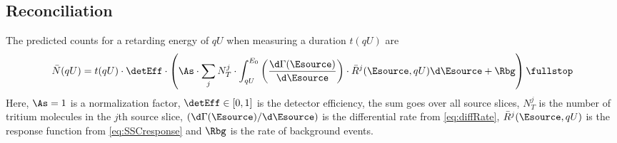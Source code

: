 \subsection{Reconciliation}
The predicted counts for a retarding energy of $qU$ when measuring a duration $t(qU)$ are
\begin{equation}
	\label{eq:countsSCCFinal}
	\bar{N}(qU) = t(qU) \cdot \detEff \cdot \left(
		\As \cdot
		 \sum_{j}
			N_T^j \cdot
			\int_{qU}^{E_0} 
				\left(\frac{\d \Gamma(\Esource)}{ \d \Esource}\right) \cdot 
				\bar{R}^j(\Esource, qU) 
			\d \Esource +
			\Rbg
		\right)
	\fullstop
\end{equation}
Here, $\As=1$ is a normalization factor, $\detEff \in [0,1]$ is the detector efficiency, the sum goes over all source slices, $N_T^j$ is the number of tritium molecules in the $j$th source slice, $\left(\d \Gamma(\Esource) / \d \Esource \right)$ is the differential rate from \eqref{eq:diffRate}, $\bar{R}^j(\Esource, qU)$ is the response function from \eqref{eq:SSCresponse} and $\Rbg$ is the rate of background events.

